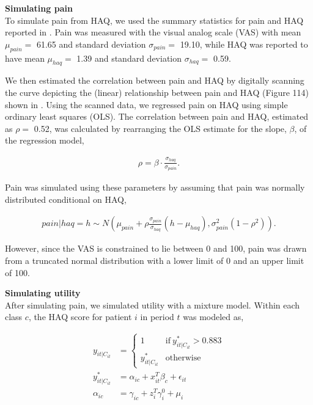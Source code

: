 \documentclass[11pt,final,fleqn]{article}\usepackage[]{graphicx}\usepackage[]{color}
\theoremstyle{plain}
\begin{document}
\begin{appendices}
\textbf{Simulating pain}\\
To simulate pain from HAQ, we used the summary statistics for pain and HAQ reported in \citet{sarzi2002correlation}. Pain was measured with the visual analog scale (VAS) with mean  $\mu_{pain} =$ 61.65 and standard deviation $\sigma_{pain} =$ 19.10, while HAQ was reported to have mean $\mu_{haq} =$ 1.39 and standard deviation $\sigma_{haq} =$ 0.59. 

We then estimated the correlation between pain and HAQ by digitally scanning the curve depicting the (linear) relationship between pain and HAQ (Figure 114) shown in \citet{stevenson2016adalimumab}. Using the scanned data, we regressed pain on HAQ using simple ordinary least squares (OLS). The correlation between pain and HAQ, estimated as $\rho =$ 0.52, was calculated by rearranging the OLS estimate for the slope, $\beta$, of the regression model,

\begin{align}
\rho = \beta \cdot \frac{\sigma_{haq}}{\sigma_{pain}}.
\end{align}

Pain was simulated using these parameters by assuming that pain was normally distributed conditional on HAQ,

\begin{align}
pain | haq = h \sim N\left (\mu_{pain} + \rho \frac{\sigma_{pain}}{\sigma_{haq}}(h - \mu_{haq}), \sigma^2_{pain}(1 - \rho^2)\right).
\end{align}

However, since the VAS is constrained to lie between 0 and 100, pain was drawn from a truncated normal distribution with a lower limit of 0 and an upper limit of 100. 


\textbf{Simulating utility}\\
After simulating pain, we simulated utility with a mixture model. Within each class $c$, the HAQ score for patient $i$ in period $t$ was modeled as,

\begin{align}
y_{it|C_{it}} &= 
\begin{cases}
  1 & \text{if}\  y^{*}_{it|C_{it}}>0.883 \\
  y^{*}_{it|C_{it}} & \text{otherwise}
\end{cases}\\
y^{*}_{it|C_{it}} &= \alpha_{ic} +  x_{it}^T\beta_{c} + \epsilon_{it}\\
\alpha_{ic} &= \gamma_{ic} + z_{i}^T\gamma_{i}^{0} + \mu_{i}
\end{align}


\end{appendices}
\end{document}
